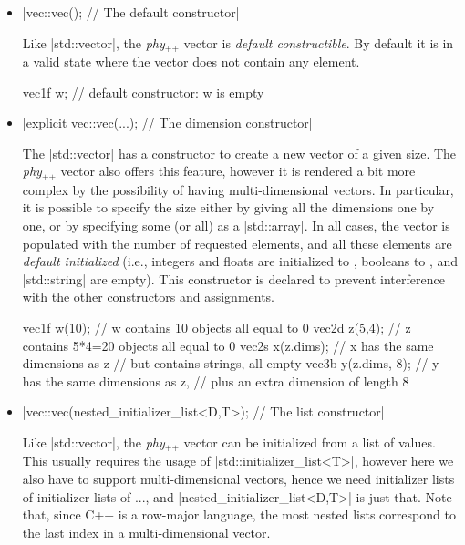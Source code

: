 \documentclass[12pt]{report}
\newcommand{\phypp}{\textit{phy}$_{\text{++}}$\xspace}
\newcommand{\stdvec}{\cppinline|std::vector|\xspace}
\newenvironment{example}
{
    \begin{mdframed}[style=example,frametitle={Example}]
}
{
    \end{mdframed}
}
\newcommand{\cppfalse}{\cppinline{false}\xspace}
\begin{document}
\begin{itemize}
\item \cppinline|vec::vec(); // The default constructor|

Like \stdvec, the \phypp vector is \emph{default constructible}. By default it is in a valid state where the vector does not contain any element.

\begin{example}
\begin{cppcode}
vec1f w; // default constructor: w is empty
\end{cppcode}
\end{example}

\item \cppinline|explicit vec::vec(...); // The dimension constructor|

The \stdvec has a constructor to create a new vector of a given size. The \phypp vector also offers this feature, however it is rendered a bit more complex by the possibility of having multi-dimensional vectors. In particular, it is possible to specify the size either by giving all the dimensions one by one, or by specifying some (or all) as a \cppinline|std::array|. In all cases, the vector is populated with the number of requested elements, and all these elements are \emph{default initialized} (i.e., integers and floats are initialized to , booleans to \cppfalse, and \cppinline|std::string| are empty). This constructor is declared  to prevent interference with the other constructors and assignments.

\begin{example}
\begin{cppcode}
vec1f w(10);     // w contains 10 objects all equal to 0
vec2d z(5,4);    // z contains 5*4=20 objects all equal to 0
vec2s x(z.dims); // x has the same dimensions as z
                 // but contains strings, all empty
vec3b y(z.dims, 8); // y has the same dimensions as z,
                 // plus an extra dimension of length 8
\end{cppcode}
\end{example}

\item \cppinline|vec::vec(nested_initializer_list<D,T>); // The list constructor|

Like \stdvec, the \phypp vector can be initialized from a list of values. This usually requires the usage of \cppinline|std::initializer_list<T>|, however here we also have to support multi-dimensional vectors, hence we need initializer lists of initializer lists of ..., and \cppinline|nested_initializer_list<D,T>| is just that. Note that, since C++ is a row-major language, the most nested lists correspond to the last index in a multi-dimensional vector.


\end{itemize}
\end{document}
